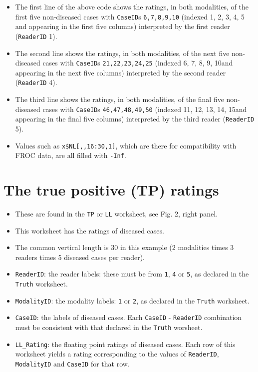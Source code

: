 \documentclass[
]{book}
\providecommand{\tightlist}{%
  \setlength{\itemsep}{0pt}\setlength{\parskip}{0pt}}
\begin{document}
\begin{itemize}
\tightlist
\item
  The first line of the above code shows the ratings, in both modalities, of the first five non-diseased cases with \texttt{CaseID}s \texttt{6,7,8,9,10} (indexed 1, 2, 3, 4, 5 and appearing in the first five columns) interpreted by the first reader (\texttt{ReaderID} 1).
\item
  The second line shows the ratings, in both modalities, of the next five non-diseased cases with \texttt{CaseID}s \texttt{21,22,23,24,25} (indexed 6, 7, 8, 9, 10and appearing in the next five columns) interpreted by the second reader (\texttt{ReaderID} 4).
\item
  The third line shows the ratings, in both modalities, of the final five non-diseased cases with \texttt{CaseID}s \texttt{46,47,48,49,50} (indexed 11, 12, 13, 14, 15and appearing in the final five columns) interpreted by the third reader (\texttt{ReaderID} 5).
\item
  Values such as \texttt{x\$NL{[},,16:30,1{]}}, which are there for compatibility with FROC data, are all filled with \texttt{-Inf}.
\end{itemize}

\hypertarget{the-true-positive-tp-ratings-2}{%
\section{The true positive (TP) ratings}\label{the-true-positive-tp-ratings-2}}

\begin{itemize}
\tightlist
\item
  These are found in the \texttt{TP} or \texttt{LL} worksheet, see Fig. 2, right panel.
\item
  This worksheet has the ratings of diseased cases.
\item
  The common vertical length is 30 in this example (2 modalities times 3 readers times 5 diseased cases per reader).
\item
  \texttt{ReaderID}: the reader labels: these must be from \texttt{1}, \texttt{4} or \texttt{5}, as declared in the \texttt{Truth} worksheet.
\item
  \texttt{ModalityID}: the modality labels: \texttt{1} or \texttt{2}, as declared in the \texttt{Truth} worksheet.
\item
  \texttt{CaseID}: the labels of diseased cases. Each \texttt{CaseID} - \texttt{ReaderID} combination must be consistent with that declared in the \texttt{Truth} worsheet.\\
\item
  \texttt{LL\_Rating}: the floating point ratings of diseased cases. Each row of this worksheet yields a rating corresponding to the values of \texttt{ReaderID}, \texttt{ModalityID} and \texttt{CaseID} for that row.
\end{itemize}
\end{document}
